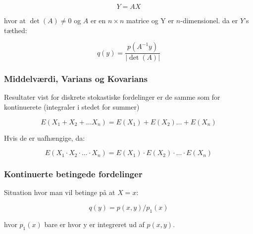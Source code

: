 \begin{equation}
    Y = AX
\end{equation}


hvor at $\det(A) \neq 0$ og $A$ er en $n \times n$ matrice og Y er $n$-dimensionel. da er $Y$'s tæthed:

\begin{equation}
    q(y) = \frac{p(A^{-1}y)}{\lvert \det(A) \rvert}
\end{equation}

\subsubsection{Middelværdi, Varians og Kovarians}

Resultater vist for diskrete stokastiske fordelinger er de samme som for kontinuerete (integraler i stedet for summer)

\begin{equation}
    E(X_1 + X_2 + \ldots X_n) = E(X_1) + E(X_2) \ldots + E(X_n)
\end{equation}

Hvis de er uafhængige, da:

\begin{equation}
    E(X_1 \cdot X_2 \cdot \ldots \cdot X_n) = E(X_1) \cdot E(X_2) \cdot \ldots \cdot E(X_n)    
\end{equation}

\subsubsection{Kontinuerte betingede fordelinger}

Situation hvor man vil betinge på at $X=x$:

\begin{equation}
    q(y) = p(x,y) / p_1(x)
\end{equation}

hvor $p_1(x)$ bare er hvor y er integreret ud af $p(x,y)$.

